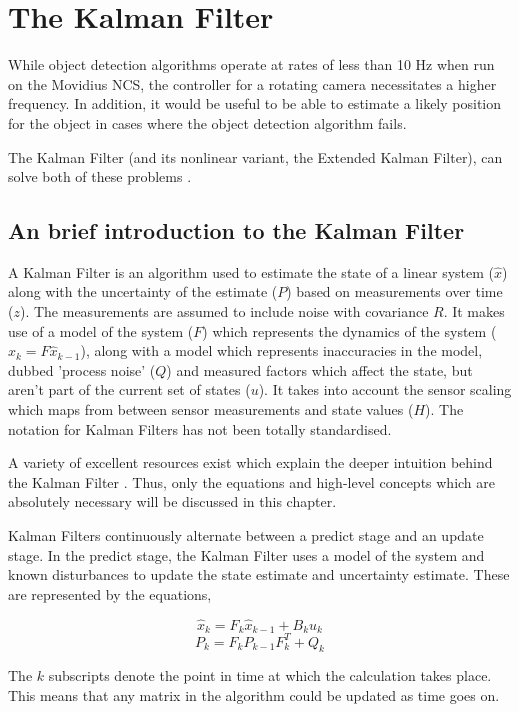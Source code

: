 \section{The Kalman Filter}

While object detection algorithms operate at rates of less than 10 Hz when run on the Movidius NCS, the controller for a rotating camera necessitates a higher frequency. In addition, it would be useful to be able to estimate a likely position for the object in cases where the object detection algorithm fails.

The Kalman Filter (and its nonlinear variant, the Extended Kalman Filter), can solve both of these problems \cite{kalman1960new}.

\subsection{An brief introduction to the Kalman Filter}
A Kalman Filter is an algorithm used to estimate the state of a linear system ($\hat{x}$) along with the uncertainty of the estimate ($P$) based on measurements over time ($z$). The measurements are assumed to include noise with covariance $R$. It makes use of a model of the system ($F$) which represents the dynamics of the system ($\hat{x}_{k} = F\hat{x}_{k-1}$), along with a model which represents inaccuracies in the model, dubbed 'process noise' ($Q$) and measured factors which affect the state, but aren't part of the current set of states ($u$). It takes into account the sensor scaling which maps from between sensor measurements and state values ($H$). The notation for Kalman Filters has not been totally standardised.

A variety of excellent resources exist which explain the deeper intuition behind the Kalman Filter \cite{website:wlu_kalman_tutorial, website:bzarg_kalman_tutorial}. Thus, only the equations and high-level concepts which are absolutely necessary will be discussed in this chapter.

Kalman Filters continuously alternate between a predict stage and an update stage. In the predict stage, the Kalman Filter uses a model of the system and known disturbances to update the state estimate and uncertainty estimate. These are represented by the equations,

\[ \hat{x}_k = F_k \hat{x}_{k-1} + B_k u_k \]
\[ P_k = F_k P_{k-1} F_k^T + Q_k \]

The $k$ subscripts denote the point in time at which the calculation takes place. This means that any matrix in the algorithm could be updated as time goes on.

